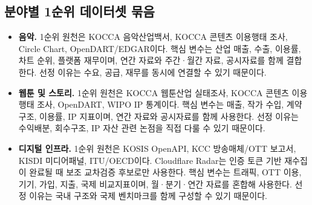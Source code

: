 \documentclass[11pt,a4paper]{report}
\begin{document}
\subsection{분야별 1순위 데이터셋 묶음}
\begin{itemize}[leftmargin=*, itemsep=0.5em]
  \item \textbf{음악.} 1순위 원천은 KOCCA 음악산업백서, KOCCA 콘텐츠 이용행태 조사, Circle Chart, OpenDART/EDGAR이다. 핵심 변수는 산업 매출, 수출, 이용률, 차트 순위, 플랫폼 재무이며, 연간 자료와 주간·월간 자료, 공시자료를 함께 결합한다. 선정 이유는 수요, 공급, 재무를 동시에 연결할 수 있기 때문이다.
  \item \textbf{웹툰 및 스토리.} 1순위 원천은 KOCCA 웹툰산업 실태조사, KOCCA 콘텐츠 이용행태 조사, OpenDART, WIPO IP 통계이다. 핵심 변수는 매출, 작가 수입, 계약구조, 이용률, IP 지표이며, 연간 자료와 공시자료를 함께 사용한다. 선정 이유는 수익배분, 회수구조, IP 자산 관련 논점을 직접 다룰 수 있기 때문이다.
  \item \textbf{디지털 인프라.} 1순위 원천은 KOSIS OpenAPI, KCC 방송매체/OTT 보고서, KISDI 미디어패널, ITU/OECD이다. Cloudflare Radar는 인증 토큰 기반 재수집이 완료될 때 보조 교차검증 후보로만 사용한다. 핵심 변수는 트래픽, OTT 이용, 기기, 가입, 지출, 국제 비교지표이며, 월·분기·연간 자료를 혼합해 사용한다. 선정 이유는 국내 구조와 국제 벤치마크를 함께 구성할 수 있기 때문이다.
\end{itemize}
\end{document}

